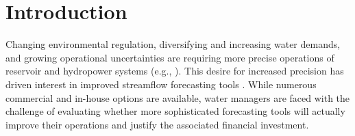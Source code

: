 \documentclass[MLA,Times1COL, hidelinks, doublespace]{WileyNJDv5} %
\begin{document}
\maketitle




\section{Introduction}


Changing environmental regulation, diversifying and increasing water demands, and growing operational uncertainties are requiring more precise operations of reservoir and hydropower systems (e.g., \cite{leeDevelopingResilientReservoir2025,guoReservoirControlOperations2024,badrDamSystemReservoir2023,aljodaUncertaintiesRisksReservoir2021}). This desire for increased precision has driven interest in improved streamflow forecasting tools \citep{yangSensitivityForecastValue2021,paganoChallengesOperationalRiver2014, liuAdvancingDataAssimilation2012}. While numerous commercial and in-house options are available, water managers are faced with the challenge of evaluating whether more sophisticated forecasting tools will actually improve their operations and justify the associated financial investment. 

\end{document}
